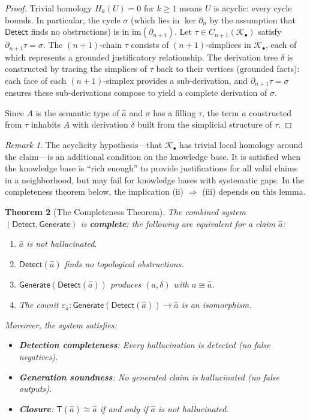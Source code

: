 \documentclass[11pt,a4paper]{article}
\theoremstyle{plain}
\newtheorem{theorem}{Theorem}[section]
\theoremstyle{definition}
\theoremstyle{remark}
\newtheorem{remark}[theorem]{Remark}
\newcommand{\im}{\mathrm{im}}
\newcommand{\Detect}{\mathsf{Detect}}
\newcommand{\Generate}{\mathsf{Generate}}
\newcommand{\SemanticT}{\mathsf{T}}
\begin{document}
\begin{proof}
Trivial homology $H_k(U) = 0$ for $k \geq 1$ means $U$ is acyclic: every cycle bounds. In particular, the cycle $\sigma$ (which lies in $\ker \partial_n$ by the assumption that $\Detect$ finds no obstructions) is in $\im(\partial_{n+1})$. Let $\tau \in C_{n+1}(\mathcal{K}_\bullet)$ satisfy $\partial_{n+1} \tau = \sigma$. The $(n+1)$-chain $\tau$ consists of $(n+1)$-simplices in $\mathcal{K}_\bullet$, each of which represents a grounded justificatory relationship. The derivation tree $\delta$ is constructed by tracing the simplices of $\tau$ back to their vertices (grounded facts): each face of each $(n+1)$-simplex provides a sub-derivation, and $\partial_{n+1} \tau = \sigma$ ensures these sub-derivations compose to yield a complete derivation of $\sigma$.

Since $A$ is the semantic type of $\hat{a}$ and $\sigma$ has a filling $\tau$, the term $a$ constructed from $\tau$ inhabits $A$ with derivation $\delta$ built from the simplicial structure of $\tau$.
\end{proof}

\begin{remark}\label{rem:acyclicity-hypothesis}
The acyclicity hypothesis---that $\mathcal{K}_\bullet$ has trivial local homology around the claim---is an additional condition on the knowledge base. It is satisfied when the knowledge base is ``rich enough'' to provide justifications for all valid claims in a neighborhood, but may fail for knowledge bases with systematic gaps. In the completeness theorem below, the implication (ii) $\Rightarrow$ (iii) depends on this lemma.
\end{remark}

\begin{theorem}[The Completeness Theorem]\label{thm:completeness}
The combined system $(\Detect, \Generate)$ is \textbf{complete}: the following are equivalent for a claim $\hat{a}$:
\begin{enumerate}[nosep]
  \item[(i)] $\hat{a}$ is not hallucinated.
  \item[(ii)] $\Detect(\hat{a})$ finds no topological obstructions.
  \item[(iii)] $\Generate(\Detect(\hat{a}))$ produces $(a, \delta)$ with $a \cong \hat{a}$.
  \item[(iv)] The counit $\varepsilon_{\hat{a}}\colon \Generate(\Detect(\hat{a})) \to \hat{a}$ is an isomorphism.
\end{enumerate}
Moreover, the system satisfies:
\begin{itemize}[nosep]
  \item \textbf{Detection completeness}: Every hallucination is detected (no false negatives).
  \item \textbf{Generation soundness}: No generated claim is hallucinated (no false outputs).
  \item \textbf{Closure}: $\SemanticT(\hat{a}) \cong \hat{a}$ if and only if $\hat{a}$ is not hallucinated.
\end{itemize}
\end{theorem}
\end{document}
